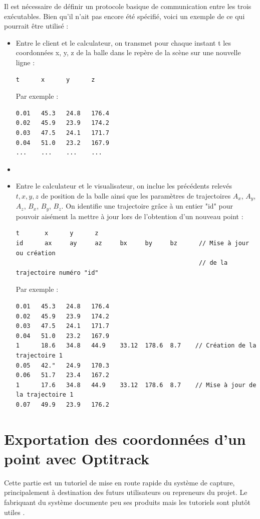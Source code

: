 \documentclass{article}[11pt]
\begin{document}
Il est nécessaire de définir un protocole basique de communication entre les trois exécutables. Bien qu'il n'ait pas encore été spécifié, voici un exemple de ce qui pourrait être utilisé : \\
\begin{itemize}
\item Entre le client et le calculateur, on transmet pour chaque instant t les coordonnées x, y, z de la balle dans le repère de la scène sur une nouvelle ligne : \\
\begin{verbatim}
t      x      y      z
\end{verbatim}
Par exemple :
\begin{verbatim}
0.01   45.3   24.8   176.4
0.02   45.9   23.9   174.2
0.03   47.5   24.1   171.7
0.04   51.0   23.2   167.9
...    ...    ...    ...
\end{verbatim}

\item
\item Entre le calculateur et le visualisateur, on inclue les précédents relevés $t, x, y, z$ de position de la balle ainsi que les paramètres de trajectoires $A_x$, $A_y$, $A_z$, $B_x$, $B_y$, $B_z$. On identifie une trajectoire grâce à un entier "id" pour pouvoir aisément la mettre à jour lors de l'obtention d'un nouveau point :
\begin{verbatim}
t       x      y      z
id      ax     ay     az     bx     by     bz      // Mise à jour ou création
                                                   // de la trajectoire numéro "id"
\end{verbatim}
Par exemple :
\begin{verbatim}
0.01   45.3   24.8   176.4
0.02   45.9   23.9   174.2
0.03   47.5   24.1   171.7
0.04   51.0   23.2   167.9
1      18.6   34.8   44.9    33.12  178.6  8.7    // Création de la trajectoire 1
0.05   42."   24.9   170.3
0.06   51.7   23.4   167.2
1      17.6   34.8   44.9    33.12  178.6  8.7    // Mise à jour de la trajectoire 1
0.07   49.9   23.9   176.2
\end{verbatim}
\end{itemize}

\section{Exportation des coordonnées d'un point avec Optitrack}

Cette partie est un tutoriel de mise en route rapide du système de capture, principalement à destination des futurs utilisateurs ou repreneurs du projet. Le fabriquant du système documente peu ses produits mais les tutoriels sont plutôt utiles \cite{naturalpoint_tutoriels}. \\
\end{document}
